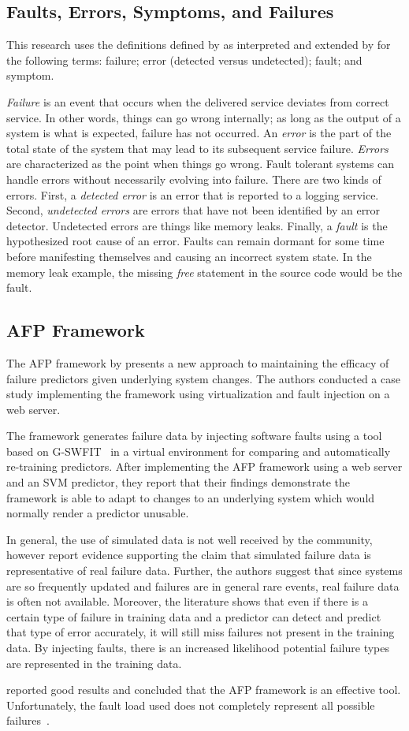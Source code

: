 \subsection{Faults, Errors, Symptoms, and Failures}
This research uses the definitions defined by \citet{avivzienis2004basic} as
interpreted and extended by \citet{salfnerSurvey} for the following terms:
failure; error (detected versus undetected); fault; and symptom.

\emph{Failure} is an event that occurs when the delivered service deviates from
correct service.  In other words, things can go wrong internally; as long as
the output of a system is what is expected, failure has not occurred.  An
\emph{error} is the part of the total state of the system that may lead to its
subsequent service failure.  \emph{Errors} are characterized as the point when
things go wrong.  Fault tolerant systems can handle errors without necessarily
evolving into failure.  There are two kinds of errors.  First, a \emph{detected
error} is an error that is reported to a logging service.  Second,
\emph{undetected errors} are errors that have not been identified by an error
detector.  Undetected errors are things like memory leaks.  Finally, a
\emph{fault} is the hypothesized root cause of an error.  Faults can remain
dormant for some time before manifesting themselves and causing an incorrect
system state.  In the memory leak example, the missing \emph{free} statement in
the source code would be the fault.  

\subsection{\acrfull{AFP} Framework} \label{afp}
The \ac{AFP} framework by \citet{irrera2015} presents a new approach to
maintaining the efficacy of failure predictors given underlying system changes.
The authors conducted a case study implementing the framework using
virtualization and fault injection on a web server.  

The framework generates failure data by injecting software faults using a tool
based on \ac{G-SWFIT}~\citep{gswfit} in a virtual environment for comparing and
automatically re-training predictors.  After implementing the \ac{AFP}
framework using a web server and an \ac{SVM} predictor, they report that their
findings demonstrate the framework is able to adapt to changes to an underlying
system which would normally render a predictor unusable.

In general, the use of simulated data is not well received by the community,
however \citet{irrera2010,irrera2014} report evidence supporting the claim that
simulated failure data is representative of real failure data.  Further, the
authors suggest that since systems are so frequently updated and failures are
in general rare events, real failure data is often not available.  Moreover,
the literature shows that even if there is a certain type of failure in
training data and a predictor can detect and predict that type of error
accurately, it will still miss failures not present in the training data.  By
injecting faults, there is an increased likelihood potential failure types are
represented in the training data.

\citet{irrera2015} reported good results and concluded that the \ac{AFP}
framework is an effective tool.  Unfortunately, the fault load used does not
completely represent all possible failures~\citep{kikuchi2014}.
